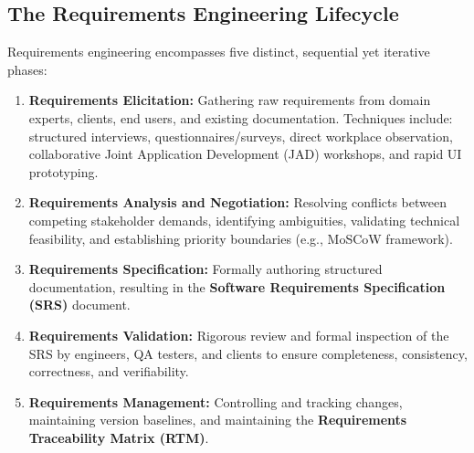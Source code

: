\subsection{The Requirements Engineering Lifecycle}
Requirements engineering encompasses five distinct, sequential yet iterative phases:
\begin{enumerate}
    \item \textbf{Requirements Elicitation:} Gathering raw requirements from domain experts, clients, end users, and existing documentation. Techniques include: structured interviews, questionnaires/surveys, direct workplace observation, collaborative Joint Application Development (JAD) workshops, and rapid UI prototyping.
    \item \textbf{Requirements Analysis and Negotiation:} Resolving conflicts between competing stakeholder demands, identifying ambiguities, validating technical feasibility, and establishing priority boundaries (e.g., MoSCoW framework).
    \item \textbf{Requirements Specification:} Formally authoring structured documentation, resulting in the \textbf{Software Requirements Specification (SRS)} document.
    \item \textbf{Requirements Validation:} Rigorous review and formal inspection of the SRS by engineers, QA testers, and clients to ensure completeness, consistency, correctness, and verifiability.
    \item \textbf{Requirements Management:} Controlling and tracking changes, maintaining version baselines, and maintaining the \textbf{Requirements Traceability Matrix (RTM)}.
\end{enumerate}

